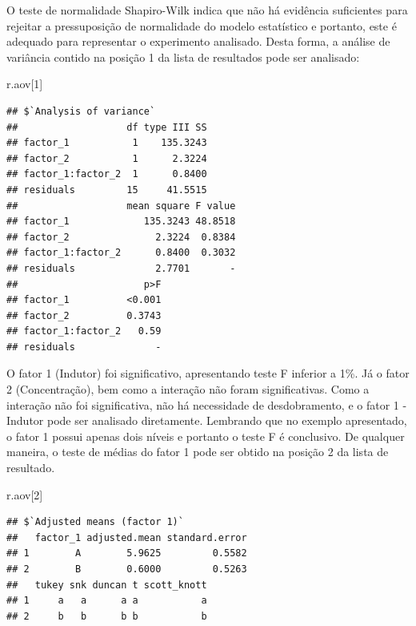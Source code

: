\documentclass[
]{article}
\newenvironment{Shaded}{\begin{snugshade}}{\end{snugshade}}
\newcommand{\DecValTok}[1]{\textcolor[rgb]{0.00,0.00,0.81}{#1}}
\newcommand{\NormalTok}[1]{#1}
\begin{document}
O teste de normalidade Shapiro-Wilk indica que não há evidência suficientes para rejeitar a pressuposição de normalidade do modelo estatístico e portanto, este é adequado para representar o experimento analisado. Desta forma, a análise de variância contido na posição 1 da lista de resultados pode ser analisado:

\begin{Shaded}
\begin{Highlighting}[]
\NormalTok{r.aov[}\DecValTok{1}\NormalTok{]}
\end{Highlighting}
\end{Shaded}

\begin{verbatim}
## $`Analysis of variance`
##                   df type III SS
## factor_1           1    135.3243
## factor_2           1      2.3224
## factor_1:factor_2  1      0.8400
## residuals         15     41.5515
##                   mean square F value
## factor_1             135.3243 48.8518
## factor_2               2.3224  0.8384
## factor_1:factor_2      0.8400  0.3032
## residuals              2.7701       -
##                      p>F
## factor_1          <0.001
## factor_2          0.3743
## factor_1:factor_2   0.59
## residuals              -
\end{verbatim}

O fator 1 (Indutor) foi significativo, apresentando teste F inferior a 1\%. Já o fator 2 (Concentração), bem como a interação não foram significativas. Como a interação não foi significativa, não há necessidade de desdobramento, e o fator 1 - Indutor pode ser analisado diretamente. Lembrando que no exemplo apresentado, o fator 1 possui apenas dois níveis e portanto o teste F é conclusivo. De qualquer maneira, o teste de médias do fator 1 pode ser obtido na posição 2 da lista de resultado.

\begin{Shaded}
\begin{Highlighting}[]
\NormalTok{r.aov[}\DecValTok{2}\NormalTok{]}
\end{Highlighting}
\end{Shaded}

\begin{verbatim}
## $`Adjusted means (factor 1)`
##   factor_1 adjusted.mean standard.error
## 1        A        5.9625         0.5582
## 2        B        0.6000         0.5263
##   tukey snk duncan t scott_knott
## 1     a   a      a a           a
## 2     b   b      b b           b
\end{verbatim}
\end{document}
